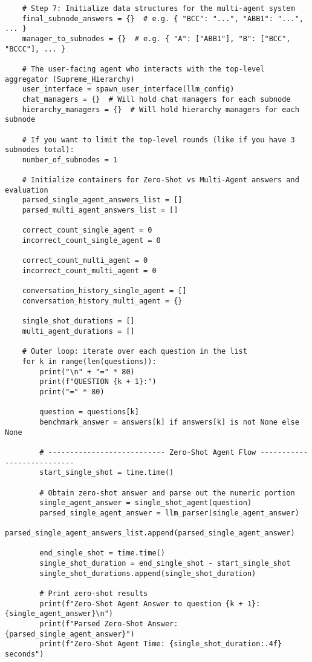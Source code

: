 \begin{lstlisting}
    # Step 7: Initialize data structures for the multi-agent system
    final_subnode_answers = {}  # e.g. { "BCC": "...", "ABB1": "...", ... }
    manager_to_subnodes = {}  # e.g. { "A": ["ABB1"], "B": ["BCC", "BCCC"], ... }

    # The user-facing agent who interacts with the top-level aggregator (Supreme_Hierarchy)
    user_interface = spawn_user_interface(llm_config)
    chat_managers = {}  # Will hold chat managers for each subnode
    hierarchy_managers = {}  # Will hold hierarchy managers for each subnode

    # If you want to limit the top-level rounds (like if you have 3 subnodes total):
    number_of_subnodes = 1

    # Initialize containers for Zero-Shot vs Multi-Agent answers and evaluation
    parsed_single_agent_answers_list = []
    parsed_multi_agent_answers_list = []

    correct_count_single_agent = 0
    incorrect_count_single_agent = 0

    correct_count_multi_agent = 0
    incorrect_count_multi_agent = 0

    conversation_history_single_agent = []
    conversation_history_multi_agent = {}

    single_shot_durations = []
    multi_agent_durations = []

    # Outer loop: iterate over each question in the list
    for k in range(len(questions)):
        print("\n" + "=" * 80)
        print(f"QUESTION {k + 1}:")
        print("=" * 80)

        question = questions[k]
        benchmark_answer = answers[k] if answers[k] is not None else None

        # --------------------------- Zero-Shot Agent Flow ---------------------------
        start_single_shot = time.time()

        # Obtain zero-shot answer and parse out the numeric portion
        single_agent_answer = single_shot_agent(question)
        parsed_single_agent_answer = llm_parser(single_agent_answer)
        parsed_single_agent_answers_list.append(parsed_single_agent_answer)

        end_single_shot = time.time()
        single_shot_duration = end_single_shot - start_single_shot
        single_shot_durations.append(single_shot_duration)

        # Print zero-shot results
        print(f"Zero-Shot Agent Answer to question {k + 1}: {single_agent_answer}\n")
        print(f"Parsed Zero-Shot Answer: {parsed_single_agent_answer}")
        print(f"Zero-Shot Agent Time: {single_shot_duration:.4f} seconds")


\end{lstlisting}
